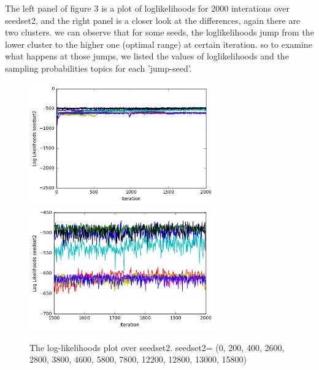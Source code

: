 \documentclass[11pt]{article}
\begin{document}
\begin{spacing}{1.6}
\noindent The left panel of figure 3 is a plot of loglikelihoods for 2000 interations over seedset2, and the right panel is a closer look at the differences, again there are two clusters. we can observe that for some seeds, the loglikelihoods jump from the lower cluster to the higher one (optimal range) at certain iteration. so to examine what happens at those jumps, we listed the values of loglikelihoods and the sampling probabilities topics for each 'jump-seed'.\\
\begin{minipage}{1.0\textwidth}
\begin{figure}[H]
\includegraphics[width = 80mm]{figure3.png}
\includegraphics[width = 80mm]{figure4.png}
\caption{The log-likelihoods plot over seedset2.  seedset2= (0, 200, 400, 2600, 2800, 3800, 4600, 5800, 7800, 12200, 12800, 13000, 15800)}\scriptsize
\end{figure}
\end{minipage}\\






\end{spacing}
\end{document}
